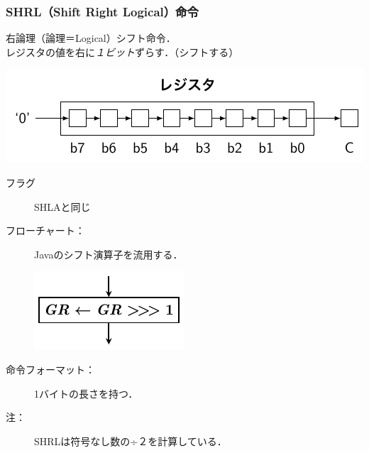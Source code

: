 \documentclass[handout]{beamer}        %
\begin{document}
\begin{frame}
  \frametitle{SHRL（Shift Right Logical）命令}
  右論理（論理＝Logical）シフト命令．\\
  レジスタの値を右に\emph{１ビット}ずらす．（シフトする）
  \vfill
  \centerline{\includegraphics[scale=0.7]{../Tikz/shft3.pdf}}
  \vfill
  \begin{description}
  \item[フラグ] SHLAと同じ
    \vfill
  \item[フローチャート：] Javaのシフト演算子を流用する．\\
    \centerline{\includegraphics[scale=0.7]{../Tikz/shrl.pdf}}
    \vfill
  \item[命令フォーマット：] 1バイトの長さを持つ．\\
  \item[注：] SHRLは符号なし数の÷２を計算している．\\
  \end{description}
  \vfill
\end{frame}
\end{document}
